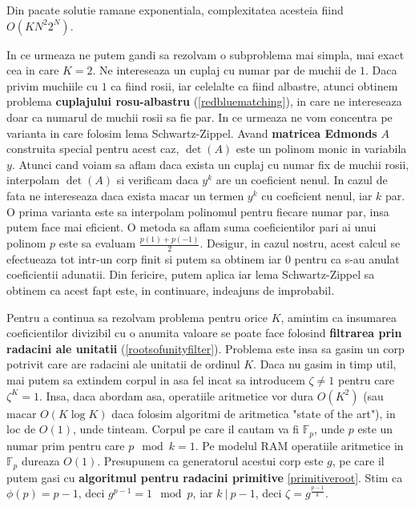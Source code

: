 \noindent Din pacate solutie ramane exponentiala, complexitatea acesteia fiind $O(KN^{2}2^{N})$.

\pagebreak

In ce urmeaza ne putem gandi sa rezolvam o subproblema mai simpla, mai exact cea in care $K=2$.
Ne intereseaza un cuplaj cu numar par de muchii de $1$. Daca privim muchiile cu $1$ ca fiind
rosii, iar celelalte ca fiind albastre, atunci obtinem problema \textbf{cuplajului rosu-albastru} (\ref{redbluematching}),
in care ne intereseaza doar ca numarul de muchii rosii sa fie par. In ce urmeaza ne vom concentra pe varianta
in care folosim lema Schwartz-Zippel. Avand \textbf{matricea Edmonds} $A$ construita special pentru acest caz,
$\det(A)$ este un polinom monic in variabila $y$. Atunci cand voiam sa aflam daca exista un cuplaj cu numar
fix de muchii rosii, interpolam $\det(A)$ si verificam daca $y^{k}$ are un coeficient nenul. In cazul de fata
ne intereseaza daca exista macar un termen $y^{k}$ cu coeficient nenul, iar $k$ par. O prima varianta este sa
interpolam polinomul pentru fiecare numar par, insa putem face mai eficient. O metoda sa aflam suma coeficientilor
pari ai unui polinom $p$ este sa evaluam $\frac{p(1) + p(-1)}{2}$. Desigur, in cazul nostru, acest calcul se
efectueaza tot intr-un corp finit si putem sa obtinem iar $0$ pentru ca s-au anulat coeficientii adunatii.
Din fericire, putem aplica iar lema Schwartz-Zippel sa obtinem ca acest fapt este, in continuare, indeajuns
de improbabil.

Pentru a continua sa rezolvam problema pentru orice $K$, amintim ca insumarea coeficientilor divizibil cu o anumita valoare
se poate face folosind \textbf{filtrarea prin radacini ale unitatii} (\ref{rootsofunityfilter}). Problema este insa
sa gasim un corp potrivit care are radacini ale unitatii de ordinul $K$. Daca nu gasim in timp util, mai putem sa extindem
corpul in asa fel incat sa introducem $\zeta \neq 1$ pentru care $\zeta^{K} = 1$. Insa, daca abordam asa, operatiile
aritmetice vor dura $O(K^{2})$ (sau macar $O(K \log K)$ daca folosim algoritmi de aritmetica "state of the art"),
in loc de $O(1)$, unde tinteam. Corpul pe care il cautam va fi $\mathbb{F}_{p}$, unde $p$ este un numar prim pentru care
$p \mod k = 1$. Pe modelul RAM operatiile aritmetice in $\mathbb{F}_{p}$ dureaza $O(1)$. Presupunem ca generatorul acestui
corp este $g$, pe care il putem gasi cu \textbf{algoritmul pentru radacini primitive} \ref{primitiveroot}. Stim ca
$\phi(p) = p - 1$, deci $g^{p - 1} = 1 \mod p$, iar $k\ |\ p - 1$, deci $\zeta = g^{\frac{p-1}{k}}$.

